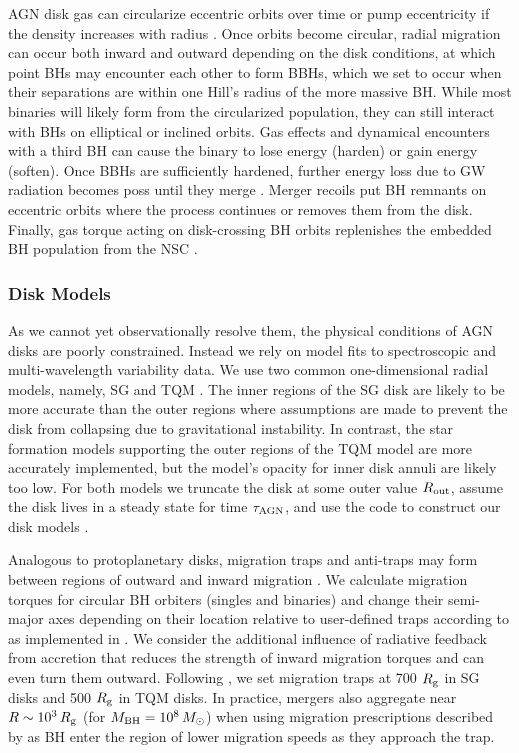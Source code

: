AGN disk gas can circularize eccentric orbits \citep{McKernan+12} over time or pump eccentricity if the density increases with radius \citep{Secunda+21}. 
Once orbits become circular, radial migration can occur both inward and outward depending on the disk conditions, at which point BHs may encounter each other to form BBHs, which we set to occur when their separations are within one Hill's radius of the more massive BH.
While most binaries will likely form from the circularized population, they can still interact with BHs on elliptical or inclined orbits.
Gas effects and dynamical encounters with a third BH can cause the binary to lose energy (harden) or gain energy (soften).
Once BBHs are sufficiently hardened, further energy loss due to GW radiation becomes poss until they merge \citep{Peters64}.
Merger recoils put BH remnants on eccentric orbits where the process continues or removes them from the disk.
Finally, gas torque acting on disk-crossing BH orbits replenishes the embedded BH population from the NSC \citep{Fabj+20,Nasim+22}.

\subsubsection{Disk Models}
As we cannot yet observationally resolve them, the physical conditions of AGN disks are poorly constrained.
Instead we rely on model fits to spectroscopic and multi-wavelength variability data.
We use two common one-dimensional radial models, namely, SG \citep{SirkoGoodman03} and TQM \citep{ThompsonQuataertMurray05}.
The inner regions of the SG disk are likely to be more accurate than the outer regions where assumptions are made to prevent the disk from collapsing due to gravitational instability.
In contrast, the star formation models supporting the outer regions of the TQM model are more accurately implemented, but the model's opacity for inner disk annuli are likely too low.
For both models we truncate the disk at some outer value $R_{\rm out}$, assume the disk lives in a steady state for time $\tau_{\rm AGN}$, and use the  code to construct our disk models \citep{Gangardt+24-pAGN}.

Analogous to protoplanetary disks, migration traps and anti-traps may form between regions of outward and inward migration \citep{Lyra+10}.
We calculate migration torques for circular BH orbiters (singles and binaries) and change their semi-major axes depending on their location relative to user-defined traps according to \citet{Paardekooper+10} as implemented in \citet{GrishinGilbaumStone24}.
We consider the additional influence of radiative feedback from accretion \citep{HanklaJiangArmitage20} that reduces the strength of inward migration torques and can even turn them outward.
Following \citet{Bellovary+16}, we set migration traps at 700 $R_{\rm g}$ in SG disks and 500 $R_{\rm g}$ in TQM disks.
In practice, mergers also aggregate near $R\sim10^3\,R_{\rm g}$ (for $M_{\rm BH} = 10^8\,M_{\odot}$) when using migration prescriptions described by \citet{GrishinGilbaumStone24} as BH enter the region of lower migration speeds as they approach the trap.

